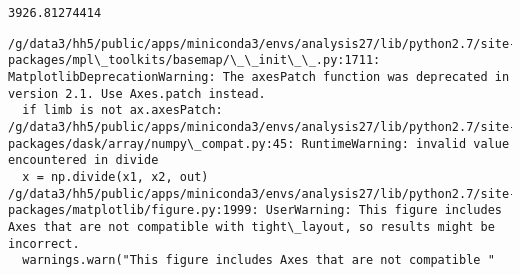 \documentclass[11pt]{article}
\begin{document}
    \begin{Verbatim}[commandchars=\\\{\}]
3926.81274414

    \end{Verbatim}

    \begin{Verbatim}[commandchars=\\\{\}]
/g/data3/hh5/public/apps/miniconda3/envs/analysis27/lib/python2.7/site-packages/mpl\_toolkits/basemap/\_\_init\_\_.py:1711: MatplotlibDeprecationWarning: The axesPatch function was deprecated in version 2.1. Use Axes.patch instead.
  if limb is not ax.axesPatch:
/g/data3/hh5/public/apps/miniconda3/envs/analysis27/lib/python2.7/site-packages/dask/array/numpy\_compat.py:45: RuntimeWarning: invalid value encountered in divide
  x = np.divide(x1, x2, out)
/g/data3/hh5/public/apps/miniconda3/envs/analysis27/lib/python2.7/site-packages/matplotlib/figure.py:1999: UserWarning: This figure includes Axes that are not compatible with tight\_layout, so results might be incorrect.
  warnings.warn("This figure includes Axes that are not compatible "

    \end{Verbatim}

    \begin{center}
    \end{center}
    { \hspace*{\fill} \\}
    
\end{document}
